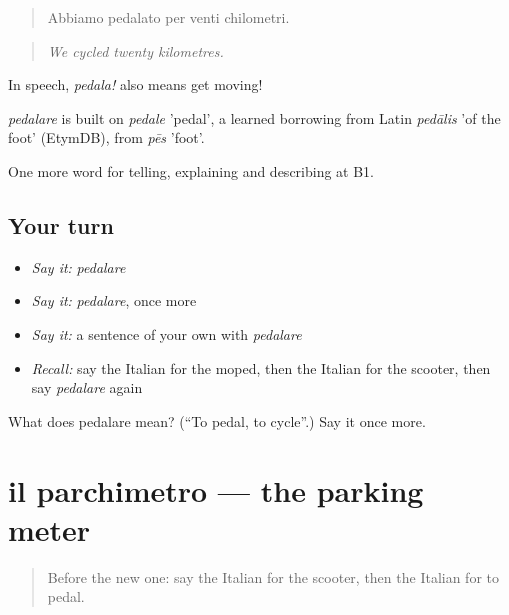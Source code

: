 \begin{quote}
Abbiamo pedalato per venti chilometri.
\end{quote}

\begin{quote}
\emph{We cycled twenty kilometres.}
\end{quote}

In speech, \emph{pedala!} also means get moving!

\begin{cousinweb}
\emph{pedalare} is built on \emph{pedale} 'pedal', a learned borrowing from Latin \emph{pedālis} 'of the foot' (EtymDB), from \emph{pēs} 'foot'.
\end{cousinweb}

\begin{grammarlens}[title={What you've built}]
One more word for telling, explaining and describing at B1.
\end{grammarlens}

\subsection*{Your turn}
\begin{itemize}
\raggedright
  \item \emph{Say it:} \emph{pedalare}
  \item \emph{Say it:} \emph{pedalare}, once more
  \item \emph{Say it:} a sentence of your own with \emph{pedalare}
  \item \emph{Recall:} say the Italian for the moped, then the Italian for the scooter, then say \emph{pedalare} again
\end{itemize}

\begin{tcolorbox}[breakable,colback=teal!4,colframe=teal!35!black,title={Before you move on}]
What does pedalare mean? (\textquotedblleft{}To pedal, to cycle\textquotedblright{}.) Say it once more.
\end{tcolorbox}
\section[il parchimetro]{il parchimetro — the parking meter}

\label{lesson:IT-C416-parchimetro}



\begin{quote}
Before the new one: say the Italian for the scooter, then the Italian for to pedal.
\end{quote}

